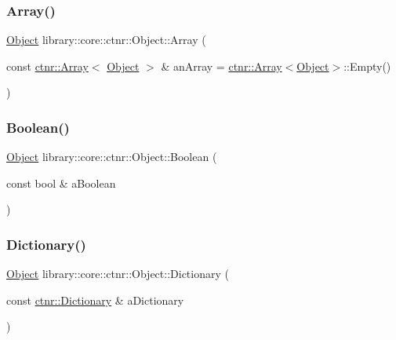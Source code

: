 \subsubsection{\texorpdfstring{Array()}{Array()}}
{\footnotesize\ttfamily \hyperlink{classlibrary_1_1core_1_1ctnr_1_1_object}{Object} library\+::core\+::ctnr\+::\+Object\+::\+Array (\begin{DoxyParamCaption}\item[{const \hyperlink{classlibrary_1_1core_1_1ctnr_1_1_array}{ctnr\+::\+Array}$<$ \hyperlink{classlibrary_1_1core_1_1ctnr_1_1_object}{Object} $>$ \&}]{an\+Array = {\ttfamily \hyperlink{classlibrary_1_1core_1_1ctnr_1_1_array}{ctnr\+::\+Array}$<$\hyperlink{classlibrary_1_1core_1_1ctnr_1_1_object}{Object}$>$\+:\+:Empty()} }\end{DoxyParamCaption})\hspace{0.3cm}{\ttfamily [static]}}

\mbox{\label{classlibrary_1_1core_1_1ctnr_1_1_object_af13e21c1db9225dd82afae1e4e120b09}} 
\subsubsection{\texorpdfstring{Boolean()}{Boolean()}}
{\footnotesize\ttfamily \hyperlink{classlibrary_1_1core_1_1ctnr_1_1_object}{Object} library\+::core\+::ctnr\+::\+Object\+::\+Boolean (\begin{DoxyParamCaption}\item[{const bool \&}]{a\+Boolean }\end{DoxyParamCaption})\hspace{0.3cm}{\ttfamily [static]}}

\mbox{\label{classlibrary_1_1core_1_1ctnr_1_1_object_ad48d5cee784b2ca83db19df024002bca}} 
\subsubsection{\texorpdfstring{Dictionary()}{Dictionary()}}
{\footnotesize\ttfamily \hyperlink{classlibrary_1_1core_1_1ctnr_1_1_object}{Object} library\+::core\+::ctnr\+::\+Object\+::\+Dictionary (\begin{DoxyParamCaption}\item[{const \hyperlink{classlibrary_1_1core_1_1ctnr_1_1_dictionary}{ctnr\+::\+Dictionary} \&}]{a\+Dictionary }\end{DoxyParamCaption})\hspace{0.3cm}{\ttfamily [static]}}

